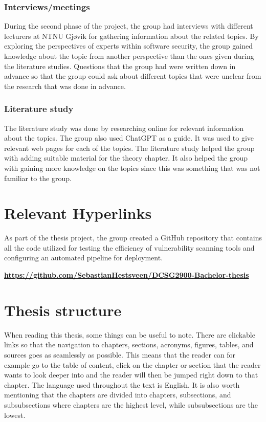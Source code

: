 \subsubsection{Interviews/meetings}
During the second phase of the project, the group had interviews with different lecturers at NTNU Gjøvik for gathering information about the related topics. By exploring the perspectives of experts within software security, the group gained knowledge about the topic from another perspective than the ones given during the literature studies. Questions that the group had were written down in advance so that the group could ask about different topics that were unclear from the research that was done in advance.   

\subsubsection{Literature study}
The literature study was done by researching online for relevant information about the topics. The group also used ChatGPT as a guide. It was used to give relevant web pages for each of the topics. The literature study helped the group with adding suitable material for the theory chapter. It also helped the group with gaining more knowledge on the topics since this was something that was not familiar to the group. 
\newpage
\section{Relevant Hyperlinks}
As part of the thesis project, the group created a GitHub repository that contains all the code utilized for testing the efficiency of vulnerability scanning tools and configuring an automated pipeline for deployment. 

\href{https://github.com/SebastianHestsveen/DCSG2900-Bachelor-thesis}{\textbf{https://github.com/SebastianHestsveen/DCSG2900-Bachelor-thesis}}

\section{Thesis structure}
When reading this thesis, some things can be useful to note. There are clickable links so that the navigation to chapters, sections, acronyms, figures, tables, and sources goes as seamlessly as possible. This means that the reader can for example go to the table of content, click on the chapter or section that the reader wants to look deeper into and the reader will then be jumped right down to that chapter. The language used throughout the text is English. It is also worth mentioning that the chapters are divided into chapters, subsections, and subsubsections where chapters are the highest level, while subsubsections are the lowest. 
